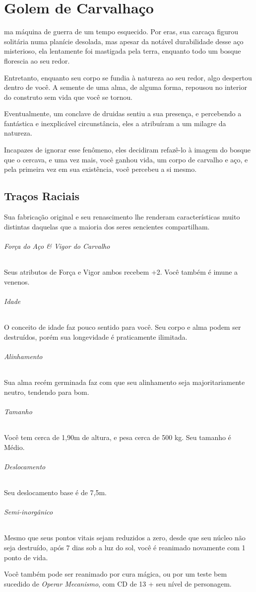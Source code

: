 \documentclass[letterpaper,twocolumn,openany]{dndbook}
\begin{document}
	
	\chapter*{\centering Golem de Carvalhaço}
	
	ma máquina de guerra de um tempo esquecido. Por eras, sua carcaça figurou solitária numa planície desolada, mas apesar da notável durabilidade desse aço misterioso, ela lentamente foi mastigada pela terra, enquanto todo um bosque florescia ao seu redor.
	
	Entretanto, enquanto seu corpo se fundia à natureza ao seu redor, algo despertou dentro de você. A semente de uma alma, de alguma forma, repousou no interior do construto sem vida que você se tornou.
	
	Eventualmente, um conclave de druidas sentiu a sua presença, e percebendo a fantástica e inexplicável circunstância, eles a atribuíram a um milagre da natureza.
	
	Incapazes de ignorar esse fenômeno, eles decidiram refazê-lo à imagem do bosque que o cercava, e uma vez mais, você ganhou vida, um corpo de carvalho e aço, e pela primeira vez em sua existência, você percebeu a si mesmo.
	
	\section{Traços Raciais}
	
	Sua fabricação original e seu renascimento lhe renderam características muito distintas daquelas que a maioria dos seres sencientes compartilham.
	
	\subparagraph{Força do Aço \& Vigor do Carvalho}
	Seus atributos de Força e Vigor ambos recebem +2. Você também é imune a venenos.
	
	\subparagraph{Idade}
	O conceito de idade faz pouco sentido para você. Seu corpo e alma podem ser destruídos, porém sua longevidade é praticamente ilimitada.
	
	\subparagraph{Alinhamento}
	Sua alma recém germinada faz com que seu alinhamento seja majoritariamente neutro, tendendo para bom.
	
	\subparagraph{Tamanho}
	Você tem cerca de 1,90m de altura, e pesa cerca de 500 kg. Seu tamanho é Médio.
	
	\subparagraph{Deslocamento}
	Seu deslocamento base é de 7,5m.
	
	\subparagraph{Semi-inorgânico}
	Mesmo que seus pontos vitais sejam reduzidos a zero, desde que seu núcleo não seja destruído, após 7 dias sob a luz do sol, você é reanimado novamente com 1 ponto de vida.
	\par Você também pode ser reanimado por cura mágica, ou por um teste bem sucedido de \textit{Operar Mecanismo}, com CD de 13 + seu nível de personagem.
	
\end{document}
